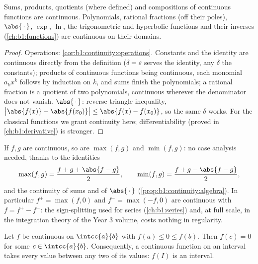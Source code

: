 \begin{proposition}\label{prop:b1:continuity:algebra}
Sums, products, quotients (where defined) and compositions of
continuous functions are continuous. Polynomials, rational fractions
(off their poles), $\abs{\,\cdot\,}$, $\exp$, $\ln$, the
trigonometric and hyperbolic functions and their inverses
(\cref{ch:b1:functions}) are continuous on their domains.
\end{proposition}

\begin{proof}
Operations: \cref{cor:b1:continuity:operations}. Constants and
the identity are continuous directly from the definition
($\delta = \varepsilon$ serves the identity, any $\delta$ the
constants); products of continuous functions being continuous,
each monomial $a_k x^k$ follows by induction on $k$, and sums
finish the polynomials; a rational fraction is a quotient of two
polynomials, continuous wherever the denominator does not
vanish. $\abs{\,\cdot\,}$: reverse triangle inequality,
$\bigl|\abs{f(x)} - \abs{f(x_0)}\bigr| \leq \abs{f(x) -
f(x_0)}$, so the same $\delta$ works. For the classical
functions we grant continuity here; differentiability (proved in
\cref{ch:b1:derivative}) is stronger.
\end{proof}

\begin{example}\label{ex:b1:continuity:maxmin}
If $f, g$ are continuous, so are $\max(f, g)$ and $\min(f, g)$:
no case analysis needed, thanks to the identities
\[
\max(f, g) = \frac{f + g + \abs{f - g}}{2},
\qquad
\min(f, g) = \frac{f + g - \abs{f - g}}{2},
\]
and the continuity of sums and of $\abs{\,\cdot\,}$
(\cref{prop:b1:continuity:algebra}). In particular $f^+ =
\max(f, 0)$ and $f^- = \max(-f, 0)$ are continuous with $f =
f^+ - f^-$: the sign-splitting used for series
(\cref{ch:b1:series}) and, at full scale, in the integration
theory of the Year 3 volume, costs nothing in regularity.
\end{example}

\begin{theorem}\label{thm:b1:continuity:ivt}
Let $f$ be continuous on $\intcc{a}{b}$ with $f(a) \leq 0 \leq
f(b)$. Then $f(c) = 0$ for some $c \in \intcc{a}{b}$.
Consequently, a continuous function on an interval takes every value
between any two of its values: $f(I)$ is an
interval.
\end{theorem}

